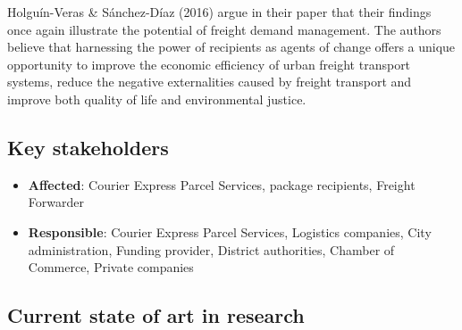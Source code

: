 \documentclass[
]{book}
\providecommand{\tightlist}{%
  \setlength{\itemsep}{0pt}\setlength{\parskip}{0pt}}
\begin{document}
Holguín-Veras \& Sánchez-Díaz (2016) argue in their paper that their findings once again illustrate the potential of freight demand management. The authors believe that harnessing the power of recipients as agents of change offers a unique opportunity to improve the economic efficiency of urban freight transport systems, reduce the negative externalities caused by freight transport and improve both quality of life and environmental justice.

\hypertarget{key-stakeholders-30}{%
\subsection*{Key stakeholders}\label{key-stakeholders-30}}

\begin{itemize}
\tightlist
\item
  \textbf{Affected}: Courier Express Parcel Services, package recipients, Freight Forwarder
\item
  \textbf{Responsible}: Courier Express Parcel Services, Logistics companies, City administration, Funding provider, District authorities, Chamber of Commerce, Private companies
\end{itemize}

\hypertarget{current-state-of-art-in-research-30}{%
\subsection*{Current state of art in research}\label{current-state-of-art-in-research-30}}
\end{document}
